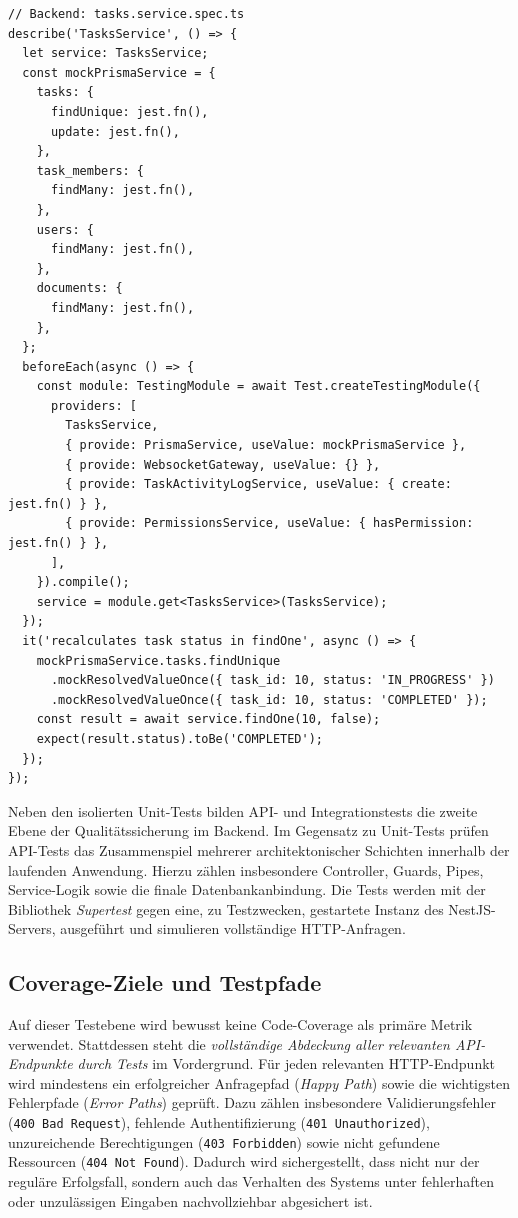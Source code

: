 \begin{listing}[H]
\begin{verbatim}
// Backend: tasks.service.spec.ts
describe('TasksService', () => {
  let service: TasksService;
  const mockPrismaService = {
    tasks: {
      findUnique: jest.fn(),
      update: jest.fn(),
    },
    task_members: {
      findMany: jest.fn(),
    },
    users: {
      findMany: jest.fn(),
    },
    documents: {
      findMany: jest.fn(),
    },
  };
  beforeEach(async () => {
    const module: TestingModule = await Test.createTestingModule({
      providers: [
        TasksService,
        { provide: PrismaService, useValue: mockPrismaService },
        { provide: WebsocketGateway, useValue: {} },
        { provide: TaskActivityLogService, useValue: { create: jest.fn() } },
        { provide: PermissionsService, useValue: { hasPermission: jest.fn() } },
      ],
    }).compile();
    service = module.get<TasksService>(TasksService);
  });
  it('recalculates task status in findOne', async () => {
    mockPrismaService.tasks.findUnique
      .mockResolvedValueOnce({ task_id: 10, status: 'IN_PROGRESS' })
      .mockResolvedValueOnce({ task_id: 10, status: 'COMPLETED' });
    const result = await service.findOne(10, false);
    expect(result.status).toBe('COMPLETED');
  });
});
\end{verbatim}
\caption{Exemplarischer Unit-Test mit gemockten Abhängigkeiten}
\label{lst:unit_test_example}
\end{listing}

\label{sec:api_tests}
Neben den isolierten Unit-Tests bilden API- und Integrationstests die zweite Ebene der Qualitätssicherung im Backend. Im Gegensatz zu Unit-Tests prüfen API-Tests das Zusammenspiel mehrerer architektonischer Schichten innerhalb der laufenden Anwendung\cite{winter2005integrationstest}. Hierzu zählen insbesondere Controller, Guards, Pipes, Service-Logik sowie die finale Datenbankanbindung. Die Tests werden mit der Bibliothek \textit{Supertest} gegen eine, zu Testzwecken, gestartete Instanz des NestJS-Servers, ausgeführt und simulieren vollständige HTTP-Anfragen\cite{nestjs_testing_docs}.

\subsection{Coverage-Ziele und Testpfade}
Auf dieser Testebene wird bewusst keine Code-Coverage als primäre Metrik verwendet. Stattdessen steht die \textit{vollständige Abdeckung aller relevanten API-Endpunkte durch Tests} im Vordergrund. Für jeden relevanten HTTP-Endpunkt wird mindestens ein erfolgreicher Anfragepfad (\textit{Happy Path}) sowie die wichtigsten Fehlerpfade (\textit{Error Paths}) geprüft. Dazu zählen insbesondere Validierungsfehler (\texttt{400 Bad Request}), fehlende Authentifizierung (\texttt{401 Unauthorized}), unzureichende Berechtigungen (\texttt{403 Forbidden}) sowie nicht gefundene Ressourcen (\texttt{404 Not Found}). Dadurch wird sichergestellt, dass nicht nur der reguläre Erfolgsfall, sondern auch das Verhalten des Systems unter fehlerhaften oder unzulässigen Eingaben nachvollziehbar abgesichert ist.


